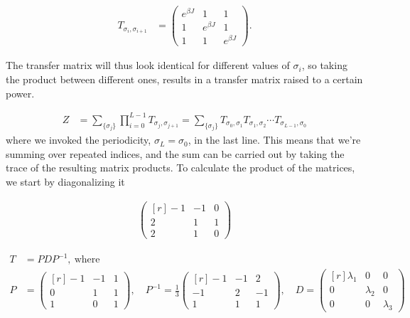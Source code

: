 \documentclass[reprint,english,notitlepage,aps,nobalancelastpage,nofootinbib]{revtex4-1}
\newcommand{\sumstate}{\sum_{\{\sigma_j\}}}
\newcommand{\prodstate}{\prod_{i=0}^{L-1}}
\newcommand{\ebj}{e^{\beta J}}
\newcommand{\T}[1]{T_{\sigma_{#1},\sigma_{#1 + 1}}}
\begin{document}
\begin{align*}
	T_{\sigma_i,\sigma_{i+1}} &= 
	\begin{pmatrix}
		e^{\beta J} & 1 & 1 \\
		1 & \ebj & 1 \\
		1 & 1 & \ebj
	\end{pmatrix}.
\end{align*}

The transfer matrix will thus look identical for different values of $\sigma_i$, so taking the product between different ones, results in a transfer matrix raised to a certain power.  

\begin{align*}
	Z &= \sumstate \prodstate \T{j} = \sumstate T_{\sigma_0,\sigma_1} T_{\sigma_1,\sigma_2}\cdots T_{\sigma_{L-1},\sigma_0} 
\end{align*}
where we invoked the periodicity, $\sigma_L=\sigma_0$, in the last line. This means that we're summing over repeated indices, and the sum can be carried out by taking the trace of the resulting matrix products. To calculate the product of the matrices, we start by diagonalizing it

\begin{align*}
	\begin{pmatrix*}[r]
		-1 & -1 & 0 \\ 
		2 & 1 & 1 \\ 
		2 & 1 & 0 
	\end{pmatrix*}
\end{align*}

\begin{align*}
	T &= PDP^{-1}, \:\mathrm{where}\: \\ 
	P &= 
	\begin{pmatrix*}[r]
		-1 & -1 & 1 \\ 
		0  & 1  & 1 \\ 
		1  & 0  & 1 
	\end{pmatrix*} ,\quad 
	P^{-1} = \frac{1}{3} \begin{pmatrix*}[r]
		-1 & -1 & 2 \\ 
		-1 & 2  & -1 \\ 
		1  & 1  & 1
	\end{pmatrix*}
	,\quad D = \begin{pmatrix*}[r]
		\lambda_1 & 0 & 0 \\ 
		0 & \lambda_2 & 0 \\
		0 & 0 & \lambda_3 
	\end{pmatrix*}
\end{align*}
\end{document}
